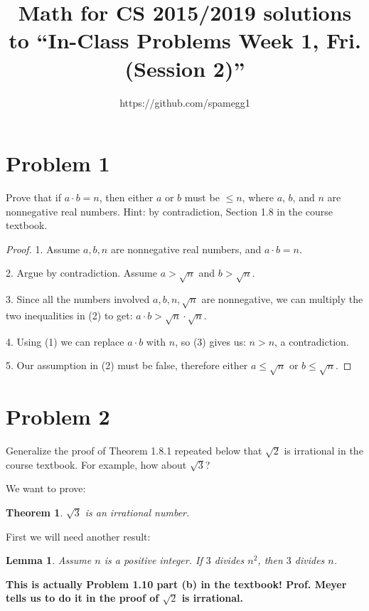 \documentclass[14pt]{extarticle}
\title{Math for CS 2015/2019 solutions to ``In-Class Problems Week 1, Fri. (Session 2)''}
\author{https://github.com/spamegg1}
\newtheorem{thm}{Theorem}
\newtheorem{lemma}{Lemma}
\begin{document}
\maketitle
\tableofcontents

\section{Problem 1}

Prove that if $a \cdot  b = n$, then either $a$ or $b$ must be $\leq n$, where $a$, $b$, and $n$ are nonnegative real numbers. Hint: by contradiction, Section 1.8 in the course textbook.

\begin{proof}
1. Assume $a, b, n$ are nonnegative real numbers, and $a \cdot b = n$. 

2. Argue by contradiction. Assume $a > \sqrt{n}$ and $b > \sqrt{n}$.

3. Since all the numbers involved $a, b, n, \sqrt{n}$ are nonnegative, we can multiply the two inequalities in (2) to get: $a \cdot b > \sqrt{n} \cdot \sqrt{n}$.

4. Using (1) we can replace $a \cdot b$ with $n$, so (3) gives us: $n > n$, a contradiction.

5. Our assumption in (2) must be false, therefore either $a \leq \sqrt{n}$ or $b \leq \sqrt{n}$.
\end{proof}

\section{Problem 2}

Generalize the proof of Theorem 1.8.1 repeated below that $\sqrt{2}$ is irrational in the course textbook. For example, how about $\sqrt{3}$?

We want to prove:

\begin{thm}
$\sqrt{3}$ is an irrational number.
\end{thm}

First we will need another result:

\begin{lemma}
Assume $n$ is a positive integer. If $3$ divides $n^2$, then $3$ divides $n$.
\end{lemma}

\textbf{This is actually Problem 1.10 part (b) in the textbook! Prof. Meyer tells us to do it in the proof of $\sqrt{2}$ is irrational.}
\end{document}
